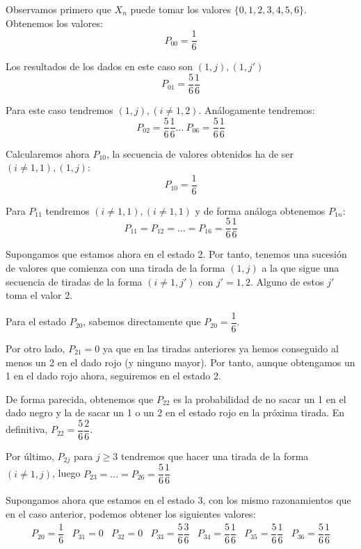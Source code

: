 \documentclass[openany]{book}
\begin{document}
\begin{exercise}
    $  $

    Observamos primero que $ X_n $ puede tomar los valores $ \{0,1,2,3,4,5,6\} $. Obtenemos los valores:
    $$ P_{00} = \dfrac{1}{6} $$
    
    Los resultados de los dados en este caso son $ (1,j),(1,j') $
    $$ P_{01} = \dfrac{5}{6}\dfrac{1}{6} $$

    Para este caso tendremos $ (1,j),(i\ne 1,2) $. Análogamente tendremos:
    $$ P_{02} = \dfrac{5}{6}\dfrac{1}{6} \dots\ P_{06}= \dfrac{5}{6}\dfrac{1}{6} $$

    Calcularemos ahora $ P_{10} $, la secuencia de valores obtenidos ha de ser $ (i\ne 1,1),(1,j) $:
    $$ P_{10}  = \dfrac{1}{6} $$

    Para $ P_{11} $ tendremos $ (i\ne 1,1),(i\ne 1,1) $ y de forma análoga obtenemos $ P_{1n} $:
    $$ P_{11} = P_{12} = ... = P_{16} = \dfrac{5}{6}\dfrac{1}{6} $$

    Supongamos que estamos ahora en el estado 2. Por tanto, tenemos una sucesión de valores que comienza con una tirada de la forma $ (1,j) $ a la que sigue una secuencia de tiradas de la forma $ (i\ne 1,j') $ con $ j' = 1,2 $. Alguno de estos $ j' $ toma el valor 2. 

    Para el estado $ P_{20} $, sabemos directamente que $ P_{20} = \dfrac{1}{6} $.
    
    Por otro lado, $ P_{21} = 0 $ ya que en las tiradas anteriores ya hemos conseguido al menos un 2 en el dado rojo (y ninguno mayor). Por tanto, aunque obtengamos un 1 en el dado rojo ahora, seguiremos en el estado 2.
    
    De forma parecida, obtenemos que $ P_{22} $ es la probabilidad de no sacar un 1 en el dado negro y la de sacar un 1 o un 2 en el estado rojo en la próxima tirada. En definitiva, $ P_{22} = \dfrac{5}{6}\dfrac{2}{6} $.

    Por último, $ P_{2j} $ para $ j \geq  3 $ tendremos que hacer una tirada de la forma $ (i\ne 1,j) $, luego $ P_{23} = ... = P_{26} = \dfrac{5}{6}\dfrac{1}{6} $

    Supongamos ahora que estamos en el estado 3, con los mismo razonamientos que en el caso anterior, podemos obtener los siguientes valores:
    $$ 
    \begin{matrix}
        P_{20} = \dfrac{1}{6} & P_{31} = 0 & P_{32} = 0 & P_{33} = \dfrac{5}{6}\dfrac{3}{6} & P_{34} = \dfrac{5}{6}\dfrac{1}{6}  & P_{35} = \dfrac{5}{6}\dfrac{1}{6} & P_{36} = \dfrac{5}{6}\dfrac{1}{6}
    \end{matrix}
    $$ 


\end{exercise}
\end{document}

